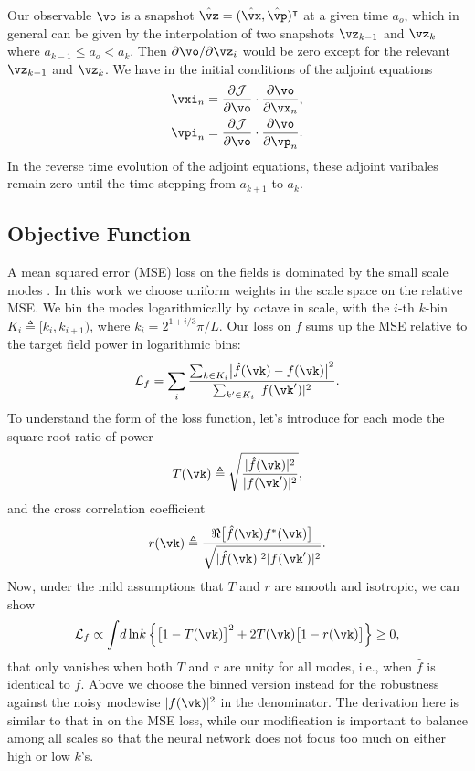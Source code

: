 \documentclass[usenatbib]{mnras}
\renewcommand{\d}{d}
\newcommand{\p}{\partial}
\newcommand{\cJ}{\mathcal{J}}
\newcommand{\cL}{\mathcal{L}}
\begin{document}
Our observable $\vo$ is a snapshot $\hat\vz = (\hat\vx, \hat\vp)^\intercal$ at a
given time $a_o$, which in general can be given by the interpolation of two
snapshots $\vz_{k-1}$ and $\vz_k$ where $a_{k-1} \leq a_o < a_k$.
Then ${\p\vo}/{\p\vz_i}$ would be zero except for the relevant $\vz_{k-1}$ and
$\vz_k$.
We have in the initial conditions of the adjoint equations
\begin{align}
  \vxi_n &= \frac{\p\cJ}{\p\vo} \cdot \frac{\p\vo}{\p\vx_n}, \nonumber\\
  \vpi_n &= \frac{\p\cJ}{\p\vo} \cdot \frac{\p\vo}{\p\vp_n}.
\end{align}
In the reverse time evolution of the adjoint equations, these adjoint varibales
remain zero until the time stepping from $a_{k+1}$ to $a_k$.


\subsection{Objective Function}

A mean squared error (MSE) loss on the fields is dominated by the small
scale modes \citep{HeEtAl2019}.
In this work we choose uniform weights in the scale space on the
relative MSE.
We bin the modes logarithmically by  octave in scale, with
the $i$-th $k$-bin $K_i \triangleq [k_i, k_{i+1})$, where $k_i =
2^{1+i/3} \pi / L$.
Our loss on $f$ sums up the MSE relative to the target field power in
logarithmic bins:
%
\begin{equation}
\cL_f = \sum_i
\frac{\sum_{k \in K_i} \bigl| \hat f(\vk) - f(\vk) \bigr|^2}
     {\sum_{k' \in K_i} |f(\vk')|^2}.
\end{equation}
%
To understand the form of the loss function, let's introduce for each
mode the square root ratio of power
%
\begin{equation}
T(\vk) \triangleq
\sqrt{\frac{|\hat f(\vk)|^2}{|f(\vk')|^2}},
\end{equation}
%
and the cross correlation coefficient
%
\begin{equation}
r(\vk) \triangleq
\frac{\Re \bigl[ \hat f(\vk) f^*(\vk) \bigr]}
     {\sqrt{|\hat f(\vk)|^2 |f(\vk')|^2}}.
\end{equation}
%
Now, under the mild assumptions that $T$ and $r$ are smooth and
isotropic, we can show
%
\begin{equation}
\cL_f \propto \int \!\d\ln\!k\, \Bigl\{ \bigl[ 1 - T(\vk) \bigr]^2
  + 2 T(\vk) \bigl[ 1 - r(\vk) \bigr] \Bigr\} \geq 0,
\end{equation}
%
that only vanishes when both $T$ and $r$ are unity for all modes, i.e.,
when $\hat f$ is identical to $f$.
Above we choose the binned version instead for the robustness against
the noisy modewise $|f(\vk)|^2$ in the denominator.
The derivation here is similar to that in \citet{HeEtAl2019} on the MSE
loss, while our modification is important to balance among all scales so
that the neural network does not focus too much on either high or low
$k$'s.
\end{document}

